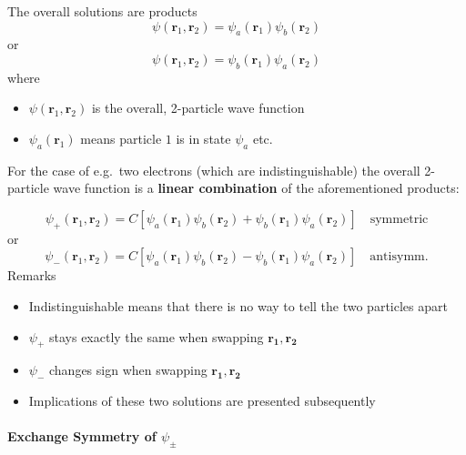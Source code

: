 The overall solutions are products
\begin{equation*}
    \psi(\mathbf{r}_{1},\mathbf{r}_{2})=\psi_{a}(\mathbf{r}_{1})\psi_{b}(\mathbf{r}_{2})
\end{equation*}
or
\begin{equation*}
    \psi(\mathbf{r}_{1},\mathbf{r}_{2})=\psi_{b}(\mathbf{r}_{1})\psi_{a}(\mathbf{r}_{2})
\end{equation*}
where
\begin{itemize}
    \item $\psi(\mathbf{r}_{1},\mathbf{r}_{2})$ is the overall, 2-particle wave function
    \item $\psi_{a}(\mathbf{r}_{1})$ means particle $1$ is in state $\psi_{a}$ etc.
\end{itemize}

\newpar{}

For the case of e.g.\ two electrons (which are indistinguishable) the overall 2-particle wave function is a \textbf{linear combination} of the aforementioned products:

\begin{equation*}
    \psi_{+}(\mathbf{r}_{1},\mathbf{r}_{2})=C\left[\psi_{a}(\mathbf{r}_{1})\psi_{b}(\mathbf{r}_{2})+\psi_{b}(\mathbf{r}_{1})\psi_{a}(\mathbf{r}_{2})\right]\quad \mathrm{symmetric}
\end{equation*}
or
\begin{equation*}
    \psi_{-}(\mathbf{r}_{1},\mathbf{r}_{2})=C\left[\psi_{a}(\mathbf{r}_{1})\psi_{b}(\mathbf{r}_{2})-\psi_{b}(\mathbf{r}_{1})\psi_{a}(\mathbf{r}_{2})\right]\quad \mathrm{antisymm.}
\end{equation*}
Remarks
\begin{itemize}
    \item Indistinguishable means that there is no way to  tell the two particles apart
    \item $\psi_{+}$ stays exactly the same when swapping $\mathbf{r_1},\mathbf{r_2}$
    \item $\psi_{-}$ changes sign when swapping $\mathbf{r_1},\mathbf{r_2}$
    \item Implications of these two solutions are presented subsequently
\end{itemize}

\paragraph[Exchange Symmetry of psi]{Exchange Symmetry of $\psi_{\pm}$}


